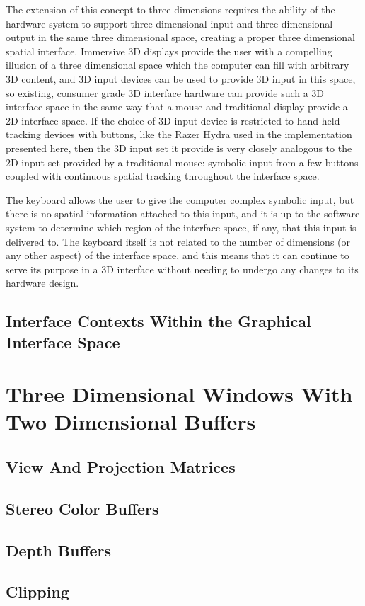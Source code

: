 The extension of this concept to three dimensions requires the ability of the hardware system to support three dimensional input and three dimensional output in the same three dimensional space, creating a proper three dimensional spatial interface. Immersive 3D displays provide the user with a compelling illusion of a three dimensional space which the computer can fill with arbitrary 3D content, and 3D input devices can be used to provide 3D input in this space, so existing, consumer grade 3D interface hardware can provide such a 3D interface space in the same way that a mouse and traditional display provide a 2D interface space. If the choice of 3D input device is restricted to hand held tracking devices with buttons, like the Razer Hydra used in the implementation presented here, then the 3D input set it provide is very closely analogous to the 2D input set provided by a traditional mouse: symbolic input from a few buttons coupled with continuous spatial tracking throughout the interface space.

The keyboard allows the user to give the computer complex symbolic input, but there is no spatial information attached to this input, and it is up to the software system to determine which region of the interface space, if any, that this input is delivered to. The keyboard itself is not related to the number of dimensions (or any other aspect) of the interface space, and this means that it can continue to serve its purpose in a 3D interface without needing to undergo any changes to its hardware design.

\subsection{Interface Contexts Within the Graphical Interface Space}
	


\section{Three Dimensional Windows With Two Dimensional Buffers}
\subsection{View And Projection Matrices}
\subsection{Stereo Color Buffers}
\subsection{Depth Buffers}
\subsection{Clipping}